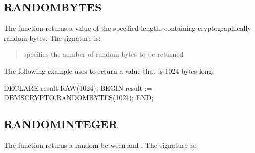 \documentclass[letterpaper,10pt,english,openany,oneside]{sphinxmanual}
\begin{document}
\subsection{RANDOMBYTES}
\label{\detokenize{randombytes::doc}}\label{\detokenize{randombytes:randombytes}}
The  function returns a  value of the specified length,
containing cryptographically random bytes. The signature is:
\begin{quote}

\begin{DUlineblock}{0em}
\item[] 
\item[]
\begin{DUlineblock}{\DUlineblockindent}
\item[] 
\end{DUlineblock}
\end{DUlineblock}
\end{quote}


\begin{quote}

 specifies the number of random bytes to be returned
\end{quote}


The following example uses  to return a value that is 1024
bytes long:

%
\begin{sphinxVerbatim}[commandchars=\\\{\}]
DECLARE
  result RAW(1024);
BEGIN
  result := DBMS\PYGZus{}CRYPTO.RANDOMBYTES(1024);
END;
\end{sphinxVerbatim}

\newpage


\subsection{RANDOMINTEGER}
\label{\detokenize{randominteger::doc}}\label{\detokenize{randominteger:randominteger}}
The  function returns a random  between  and
. The signature is:
\begin{quote}

\end{quote}
\end{document}
